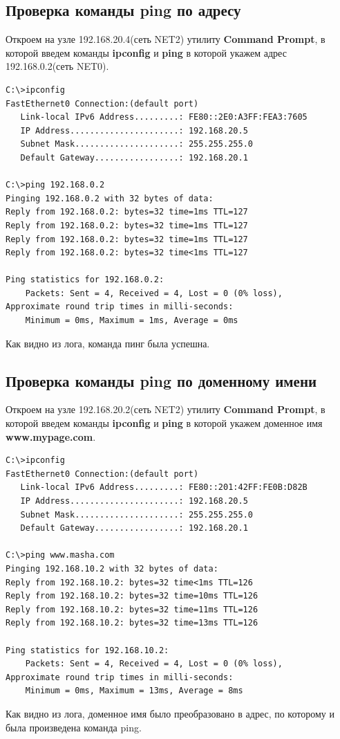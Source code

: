 \documentclass[14pt,a4paper,report]{report}
\begin{document}
\subsection{Проверка команды ping по адресу}
Откроем на узле 192.168.20.4(сеть NET2) утилиту \textbf{Command Prompt}, в которой введем команды \textbf{ipconfig} и \textbf{ping} в которой укажем адрес 192.168.0.2(сеть NET0).
\begin{lstlisting}[language={}]
C:\>ipconfig
FastEthernet0 Connection:(default port)
   Link-local IPv6 Address.........: FE80::2E0:A3FF:FEA3:7605
   IP Address......................: 192.168.20.5
   Subnet Mask.....................: 255.255.255.0
   Default Gateway.................: 192.168.20.1

C:\>ping 192.168.0.2
Pinging 192.168.0.2 with 32 bytes of data:
Reply from 192.168.0.2: bytes=32 time=1ms TTL=127
Reply from 192.168.0.2: bytes=32 time=1ms TTL=127
Reply from 192.168.0.2: bytes=32 time=1ms TTL=127
Reply from 192.168.0.2: bytes=32 time<1ms TTL=127

Ping statistics for 192.168.0.2:
    Packets: Sent = 4, Received = 4, Lost = 0 (0% loss),
Approximate round trip times in milli-seconds:
    Minimum = 0ms, Maximum = 1ms, Average = 0ms
\end{lstlisting}
Как видно из лога, команда пинг была успешна.

\subsection{Проверка команды ping по доменному имени}
Откроем на узле 192.168.20.2(сеть NET2) утилиту \textbf{Command Prompt}, в которой введем команды \textbf{ipconfig} и \textbf{ping} в которой укажем доменное имя \textbf{www.mypage.com}.
\begin{lstlisting}[language={}]
C:\>ipconfig
FastEthernet0 Connection:(default port)
   Link-local IPv6 Address.........: FE80::201:42FF:FE0B:D82B
   IP Address......................: 192.168.20.5
   Subnet Mask.....................: 255.255.255.0
   Default Gateway.................: 192.168.20.1

C:\>ping www.masha.com
Pinging 192.168.10.2 with 32 bytes of data:
Reply from 192.168.10.2: bytes=32 time<1ms TTL=126
Reply from 192.168.10.2: bytes=32 time=10ms TTL=126
Reply from 192.168.10.2: bytes=32 time=11ms TTL=126
Reply from 192.168.10.2: bytes=32 time=13ms TTL=126

Ping statistics for 192.168.10.2:
    Packets: Sent = 4, Received = 4, Lost = 0 (0% loss),
Approximate round trip times in milli-seconds:
    Minimum = 0ms, Maximum = 13ms, Average = 8ms
\end{lstlisting}
Как видно из лога, доменное имя было преобразовано в адрес, по которому и была произведена команда ping.
\end{document}
